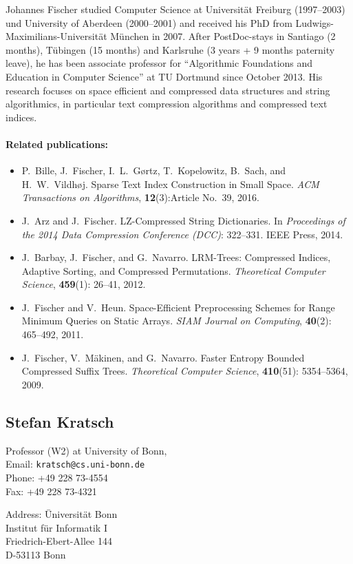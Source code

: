 \documentclass[a4paper,10pt]{article}
\begin{document}
Johannes Fischer studied Computer Science at Universit\"at Freiburg (1997--2003) und University of Aberdeen (2000--2001) and received his PhD from Ludwigs-Maximilians-Universität München in 2007. After PostDoc-stays in Santiago (2 months), Tübingen (15 months) and Karlsruhe (3 years + 9 months paternity leave), he has been associate professor for ``Algorithmic Foundations and Education in Computer Science'' at TU Dortmund since October 2013. His research focuses on space efficient and compressed data structures and string algorithmics, in particular text compression algorithms and compressed text indices. 

\paragraph{Related publications:}
\begin{itemize}
\item P.\ Bille, J.\ Fischer, I.\ L.\ G\o{}rtz, T.\ Kopelowitz, B.\ Sach, and H.\ W.\ Vildh\o{}j.
	\newblock Sparse Text Index Construction in Small Space.
	\newblock \emph{ACM Transactions on Algorithms}, \textbf{12}(3):Article No.\ 39, 2016.
\item J.\ Arz and J.\ Fischer.
	\newblock LZ-Compressed String Dictionaries.
	\newblock In \textit{Proceedings of the 2014 Data Compression Conference (DCC)}: 322--331. IEEE Press, 2014.
\item J.\ Barbay, J.\ Fischer, and G.\ Navarro.
	\newblock LRM-Trees: Compressed Indices, Adaptive Sorting, and Compressed Permutations.
	\newblock \textit{Theoretical Computer Science}, \textbf{459}(1): 26--41, 2012.
\item J.\ Fischer and V.\ Heun.
	\newblock Space-Efficient Preprocessing Schemes for Range Minimum Queries on Static Arrays.
	\newblock \textit{SIAM Journal on Computing}, \textbf{40}(2): 465--492, 2011.
\item J.\ Fischer, V.\ M\"akinen, and G.\ Navarro.
	\newblock Faster Entropy Bounded Compressed Suffix Trees.
	\newblock \textit{Theoretical Computer Science}, \textbf{410}(51): 5354--5364, 2009.
\end{itemize}

\subsection*{Stefan Kratsch}

\begin{multicols}{2}
\noindent Professor (W2) at University of Bonn, \\
Email: \texttt{kratsch@cs.uni-bonn.de} \\
Phone: +49 228 73-4554\\
Fax: +49 228 73-4321
\begin{tabbing}
Address: \= Universit\"at Bonn\\
\> Institut f\"ur Informatik I\\
\> Friedrich-Ebert-Allee 144\\
\> D-53113 Bonn
\end{tabbing}
\end{multicols}
\end{document}
